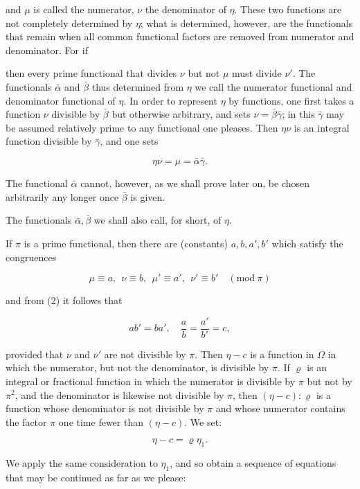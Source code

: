 

and $\mu$ is called the numerator, $\nu$ the denominator of $\eta$. These
two functions are not completely determined by $\eta$; what is determined,
however, are the functionals that remain when all common functional factors
are removed from numerator and denominator. For if


then every prime functional that divides $\nu$ but not $\mu$ must divide
$\nu'$. The functionals $\bar\alpha$ and $\bar\beta$ thus determined from
$\eta$ we call the numerator functional and denominator functional of $\eta$.
In order to represent $\eta$ by functions, one first takes a function $\nu$
divisible by $\bar\beta$ but otherwise arbitrary, and sets
$\nu = \bar\beta\bar\gamma$; in this $\bar\gamma$ may be assumed relatively
prime to any functional one pleases. Then $\eta\nu$ is an integral function
divisible by $\bar\gamma$, and one sets

\[ \eta\nu = \mu = \bar\alpha\bar\gamma. \]

The functional $\bar\alpha$ cannot, however, as we shall prove later on, be
chosen arbitrarily any longer once $\bar\beta$ is given.

The functionals $\bar\alpha, \bar\beta$ we shall also call, for short,  of $\eta$.

If $\pi$ is a prime functional, then there are  (constants) $a, b,
a', b'$ which satisfy the congruences

\[ \mu \equiv a,\ \ \nu \equiv b,\ \ \mu' \equiv a',\ \ \nu' \equiv b' \quad (\mathrm{mod}\ \pi) \]

and from (2) it follows that

\[ ab' = ba', \quad \frac{a}{b} = \frac{a'}{b'} = c, \]

provided that $\nu$ and $\nu'$ are not divisible by $\pi$. Then $\eta - c$ is
a function in $\Omega$ in which the numerator, but not the denominator, is
divisible by $\pi$. If $\varrho$ is an integral or fractional function in
which the numerator is divisible by $\pi$ but not by $\pi^2$, and the
denominator is likewise not divisible by $\pi$, then $(\eta - c) : \varrho$
is a function whose denominator is not divisible by $\pi$ and whose numerator
contains the factor $\pi$ one time fewer than $(\eta - c)$. We set:

\[ \eta - c = \varrho\eta_1. \]

We apply the same consideration to $\eta_1$, and so obtain a sequence of
equations that may be continued as far as we please:
